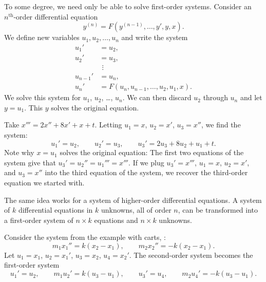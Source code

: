To some degree,
we need only be able to solve first-order systems.
Consider an $n^{\text{th}}$-order differential equation
\begin{equation*}
y^{(n)} = F(y^{(n-1)},\ldots,y',y,x) .
\end{equation*}
We define new variables $u_1, u_2, \ldots, u_n$ and write the system
\begin{align*}
u_1' & = u_2 , \\
u_2' & = u_3 , \\
& ~\, \vdots \\
u_{n-1}' & = u_n , \\
u_n' & = F(u_n,u_{n-1},\ldots,u_2,u_1,x) .
\end{align*}
We solve
this system for $u_1$, $u_2$, \ldots, $u_n$.
We can then discard $u_2$ through $u_n$
and let $y = u_1$.
This $y$ solves the original equation.

\begin{example}
Take $x''' = 2x''+ 8x' + x + t$.  Letting $u_1 = x$, $u_2 = x'$, $u_3
= x''$, we find the system:
\begin{equation*}
u_1' = u_2, \qquad u_2' = u_3, \qquad u_3' = 2u_3 + 8u_2 + u_1 + t .
\end{equation*}
Note why $x=u_1$ solves the original equation:  The first
two equations of the system give that
$u_3' = u_2'' = u_1''' = x'''$.
If we plug $u_3' = x'''$, 
$u_1 = x$, $u_2 = x'$, and $u_3
= x''$ into 
the third equation of the system, we
recover the third-order equation we started with.
\end{example}

The same idea works for a system of higher-order
differential equations.
A system of $k$ differential equations in $k$
unknowns, all of order $n$, can be transformed into a
first-order system of $n \times k$
equations and $n \times k$ unknowns.

\begin{example}
Consider the system from the example with carts, :
\begin{equation*}
m_1 x_1''  = k(x_2-x_1), \qquad m_2 x_2'' = - k(x_2-x_1) .
\end{equation*}
Let $u_1 = x_1$, $u_2 = x_1'$, 
$u_3 = x_2$, $u_4 = x_2'$.  The second-order system becomes the
first-order system
\begin{equation*}
u_1' = u_2, \qquad
m_1 u_2'  = k(u_3-u_1), \qquad
u_3' = u_4, \qquad
m_2 u_4' = - k(u_3-u_1) .
\end{equation*}
\end{example}

